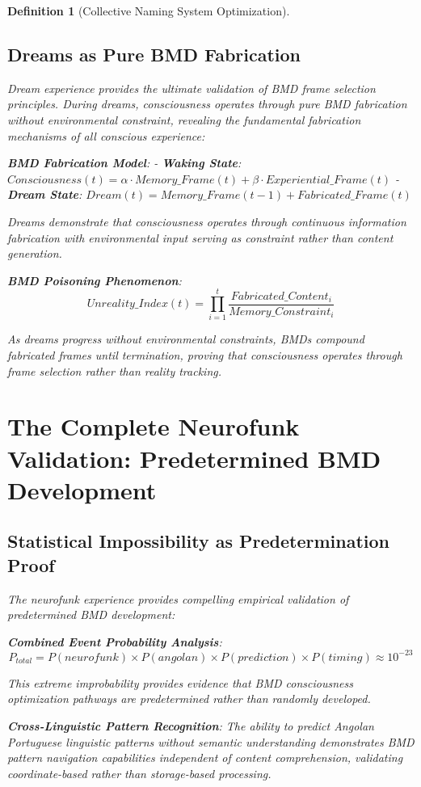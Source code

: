 \documentclass[12pt]{article}
\newtheorem{definition}{Definition}
\begin{document}
\begin{definition}[Collective Naming System Optimization]
\subsection{Dreams as Pure BMD Fabrication}

Dream experience provides the ultimate validation of BMD frame selection principles. During dreams, consciousness operates through pure BMD fabrication without environmental constraint, revealing the fundamental fabrication mechanisms of all conscious experience:

\textbf{BMD Fabrication Model}:
- \textbf{Waking State}: $Consciousness(t) = \alpha \cdot Memory\_Frame(t) + \beta \cdot Experiential\_Frame(t)$
- \textbf{Dream State}: $Dream(t) = Memory\_Frame(t-1) + Fabricated\_Frame(t)$

Dreams demonstrate that consciousness operates through continuous information fabrication with environmental input serving as constraint rather than content generation.

\textbf{BMD Poisoning Phenomenon}:
$$Unreality\_Index(t) = \prod_{i=1}^{t} \frac{Fabricated\_Content_i}{Memory\_Constraint_i}$$

As dreams progress without environmental constraints, BMDs compound fabricated frames until termination, proving that consciousness operates through frame selection rather than reality tracking.

\section{The Complete Neurofunk Validation: Predetermined BMD Development}

\subsection{Statistical Impossibility as Predetermination Proof}

The neurofunk experience provides compelling empirical validation of predetermined BMD development:

\textbf{Combined Event Probability Analysis}:
$$P_{total} = P(neurofunk) \times P(angolan) \times P(prediction) \times P(timing) \approx 10^{-23}$$

This extreme improbability provides evidence that BMD consciousness optimization pathways are predetermined rather than randomly developed.

\textbf{Cross-Linguistic Pattern Recognition}:
The ability to predict Angolan Portuguese linguistic patterns without semantic understanding demonstrates BMD pattern navigation capabilities independent of content comprehension, validating coordinate-based rather than storage-based processing.


\end{definition}
\end{document}
